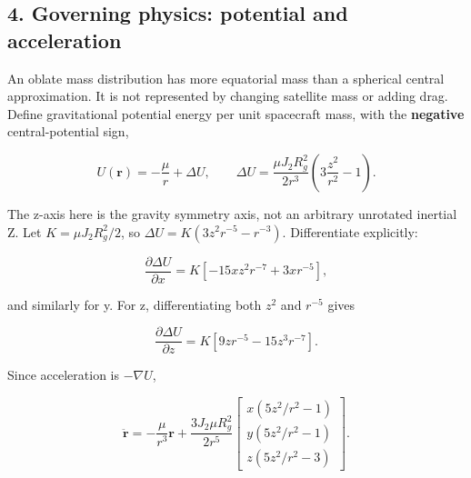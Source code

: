 \documentclass[10pt,a4paper]{article}
\numberwithin{equation}{section}
\begin{document}
\subsection*{4. Governing physics: potential and acceleration}

\begin{sloppypar}An oblate mass distribution has more equatorial mass than a spherical central approximation. It is not represented by changing satellite mass or adding drag. Define gravitational potential energy per unit spacecraft mass, with the \textbf{negative} central-potential sign,\end{sloppypar}


\begin{equation}U(\mathbf r)=-\frac{\mu}{r}+\Delta U,\qquad
\Delta U=\frac{\mu J_2R_g^2}{2r^3}
\left(3\frac{z^2}{r^2}-1\right).\label{eq:ch3-3}\end{equation}

\begin{sloppypar}The z-axis here is the gravity symmetry axis, not an arbitrary unrotated inertial Z. Let \(K=\mu J_2R_g^2/2\), so \(\Delta U=K(3z^2r^{-5}-r^{-3})\). Differentiate explicitly:\end{sloppypar}


\begin{equation}\frac{\partial\Delta U}{\partial x}
=K[-15xz^2r^{-7}+3xr^{-5}],\label{eq:ch3-4}\end{equation}

\begin{sloppypar}and similarly for y. For z, differentiating both \(z^2\) and \(r^{-5}\) gives\end{sloppypar}


\begin{equation}\frac{\partial\Delta U}{\partial z}
=K[9zr^{-5}-15z^3r^{-7}].\label{eq:ch3-5}\end{equation}

\begin{sloppypar}Since acceleration is \(-\nabla U\),\end{sloppypar}


\begin{equation}\ddot{\mathbf r}=-\frac{\mu}{r^3}\mathbf r+
\frac{3J_2\mu R_g^2}{2r^5}
\begin{bmatrix}
x(5z^2/r^2-1)\\y(5z^2/r^2-1)\\z(5z^2/r^2-3)
\end{bmatrix}.\label{eq:ch3-6}\end{equation}
\end{document}
